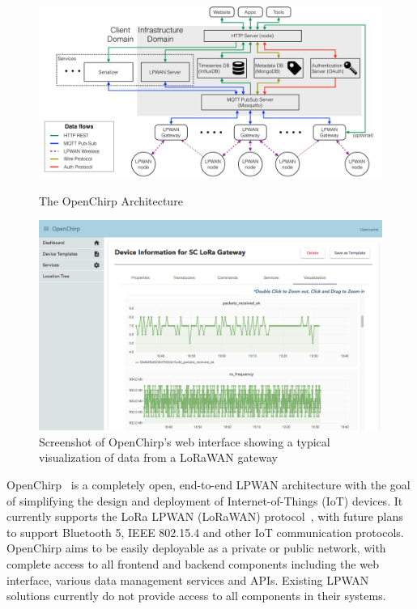 \documentclass[conference]{IEEEtran}
\begin{document}
\begin{figure}[!htb]
    \centering
    \begin{minipage}[b]{.6\textwidth}
        \centering
        \includegraphics[width=\linewidth]{figures/openChirp_architecture}
        \caption{The OpenChirp Architecture}
        \label{fig:oc-arch}
    \end{minipage}%
    \begin{minipage}[b]{.4\textwidth}
        \centering
        \includegraphics[width=\linewidth]{figures/OC_screenshot}
        \caption{Screenshot of OpenChirp's web interface showing a typical
        visualization of data from a LoRaWAN gateway}
        \label{fig:oc-screenshot}
    \end{minipage}
\end{figure}

OpenChirp~\cite{dongare2017openchirp} is a completely open, end-to-end LPWAN
architecture with the goal of simplifying the design and deployment of
Internet-of-Things (IoT) devices. It currently supports the LoRa LPWAN
(LoRaWAN) protocol~\cite{LoRaWanAlliance2015}, with future plans to support
Bluetooth 5, IEEE 802.15.4 and other IoT communication protocols. OpenChirp
aims to be easily deployable as a private or public network, with complete
access to all frontend and backend components including the web interface,
various data management services and APIs. Existing LPWAN solutions currently
do not provide access to all components in their systems.
\end{document}
